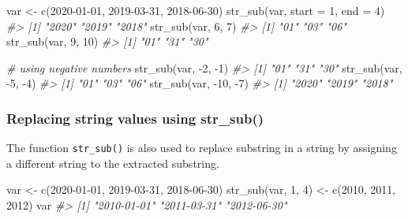 \documentclass[
]{book}
\newenvironment{Shaded}{\begin{snugshade}}{\end{snugshade}}
\newcommand{\AttributeTok}[1]{\textcolor[rgb]{0.77,0.63,0.00}{#1}}
\newcommand{\CommentTok}[1]{\textcolor[rgb]{0.56,0.35,0.01}{\textit{#1}}}
\newcommand{\DecValTok}[1]{\textcolor[rgb]{0.00,0.00,0.81}{#1}}
\newcommand{\FunctionTok}[1]{\textcolor[rgb]{0.00,0.00,0.00}{#1}}
\newcommand{\NormalTok}[1]{#1}
\newcommand{\OtherTok}[1]{\textcolor[rgb]{0.56,0.35,0.01}{#1}}
\newcommand{\SpecialCharTok}[1]{\textcolor[rgb]{0.00,0.00,0.00}{#1}}
\newcommand{\StringTok}[1]{\textcolor[rgb]{0.31,0.60,0.02}{#1}}
\begin{document}
\begin{Shaded}
\begin{Highlighting}[]
\NormalTok{var }\OtherTok{\textless{}{-}} \FunctionTok{c}\NormalTok{(}\StringTok{\textquotesingle{}2020{-}01{-}01\textquotesingle{}}\NormalTok{, }\StringTok{\textquotesingle{}2019{-}03{-}31\textquotesingle{}}\NormalTok{, }\StringTok{\textquotesingle{}2018{-}06{-}30\textquotesingle{}}\NormalTok{)}
\FunctionTok{str\_sub}\NormalTok{(var, }\AttributeTok{start =} \DecValTok{1}\NormalTok{, }\AttributeTok{end =} \DecValTok{4}\NormalTok{)}
\CommentTok{\#\textgreater{} [1] "2020" "2019" "2018"}
\FunctionTok{str\_sub}\NormalTok{(var, }\DecValTok{6}\NormalTok{, }\DecValTok{7}\NormalTok{)}
\CommentTok{\#\textgreater{} [1] "01" "03" "06"}
\FunctionTok{str\_sub}\NormalTok{(var, }\DecValTok{9}\NormalTok{, }\DecValTok{10}\NormalTok{)}
\CommentTok{\#\textgreater{} [1] "01" "31" "30"}

\CommentTok{\# using negative numbers}
\FunctionTok{str\_sub}\NormalTok{(var, }\SpecialCharTok{{-}}\DecValTok{2}\NormalTok{, }\SpecialCharTok{{-}}\DecValTok{1}\NormalTok{)}
\CommentTok{\#\textgreater{} [1] "01" "31" "30"}
\FunctionTok{str\_sub}\NormalTok{(var, }\SpecialCharTok{{-}}\DecValTok{5}\NormalTok{, }\SpecialCharTok{{-}}\DecValTok{4}\NormalTok{)}
\CommentTok{\#\textgreater{} [1] "01" "03" "06"}
\FunctionTok{str\_sub}\NormalTok{(var, }\SpecialCharTok{{-}}\DecValTok{10}\NormalTok{, }\SpecialCharTok{{-}}\DecValTok{7}\NormalTok{)}
\CommentTok{\#\textgreater{} [1] "2020" "2019" "2018"}
\end{Highlighting}
\end{Shaded}

\hypertarget{replacing-string-values-using-str_sub}{%
\subsubsection{Replacing string values using str\_sub()}\label{replacing-string-values-using-str_sub}}

The function \texttt{str\_sub()} is also used to replace substring in a string by assigning a different string to the extracted substring.

\begin{Shaded}
\begin{Highlighting}[]
\NormalTok{var }\OtherTok{\textless{}{-}} \FunctionTok{c}\NormalTok{(}\StringTok{\textquotesingle{}2020{-}01{-}01\textquotesingle{}}\NormalTok{, }\StringTok{\textquotesingle{}2019{-}03{-}31\textquotesingle{}}\NormalTok{, }\StringTok{\textquotesingle{}2018{-}06{-}30\textquotesingle{}}\NormalTok{)}
\FunctionTok{str\_sub}\NormalTok{(var, }\DecValTok{1}\NormalTok{, }\DecValTok{4}\NormalTok{) }\OtherTok{\textless{}{-}} \FunctionTok{c}\NormalTok{(}\StringTok{\textquotesingle{}2010\textquotesingle{}}\NormalTok{, }\StringTok{\textquotesingle{}2011\textquotesingle{}}\NormalTok{, }\StringTok{\textquotesingle{}2012\textquotesingle{}}\NormalTok{)}
\NormalTok{var}
\CommentTok{\#\textgreater{} [1] "2010{-}01{-}01" "2011{-}03{-}31" "2012{-}06{-}30"}
\end{Highlighting}
\end{Shaded}
\end{document}
